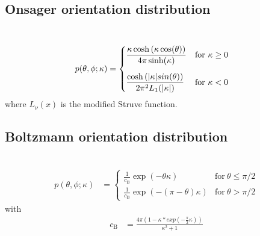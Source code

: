 \newpage
\subsection{Onsager orientation distribution} ~\\

\begin{align}
p(\theta,\phi;\kappa) & = 
\begin{cases} \displaystyle
\frac{\kappa \cosh\left(\kappa \cos(\theta)\right)}{4\pi \sinh(\kappa)}      &\mathrm{for~} \kappa \geq 0 \\[5mm]
 \displaystyle
\frac{\cosh\left(\abs{\kappa} sin(\theta)\right)}{2\pi^2 L_1(\abs{\kappa})}  &\mathrm{for~} \kappa < 0 
\end{cases}
\end{align}
where $L_\nu(x)$ is the modified Struve function.


\newpage
\subsection{Boltzmann orientation distribution} ~\\

\begin{align}
p(\theta,\phi;\kappa) & = 
\begin{cases}
\displaystyle
\frac{1}{c_\mathrm{B}}\exp\left(-\theta\kappa\right) & \mathrm{for~}  \theta \leq \pi/2\\[5mm]
\displaystyle
\frac{1}{c_\mathrm{B}}\exp\left(-(\pi-\theta)\kappa\right) & \mathrm{for~}  \theta > \pi/2
\end{cases}
\end{align}
with
\begin{align}
c_\mathrm{B} &= \frac{4\pi\left(1-\kappa*exp\left(-\frac{\pi}{2}\kappa\right)\right)}{\kappa^2+1}
\end{align}

\newpage
